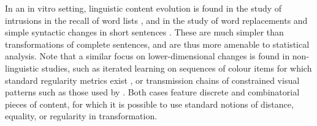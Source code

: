 \documentclass[a4paper,fleqn]{cas-dc}
\begin{document}
In an in vitro setting, linguistic content evolution is found in the study of intrusions in the recall of word lists \citep[see][for a review]{zaromb_temporal_2006}, and in the study of word replacements and simple syntactic changes in short sentences \citep{potter_regeneration_1990,lombardi_regeneration_1992}.
These are much simpler than transformations of complete sentences, and are thus more amenable to statistical analysis. Note that a similar focus on lower-dimensional changes is found in non-linguistic studies, such as iterated learning on sequences of colour items for which standard regularity metrics exist \citep{cornish_systems_2013}, or transmission chains of constrained visual patterns such as those used by \citet{claidiere_cultural_2014}. Both cases feature discrete and combinatorial pieces of content, for which it is possible to use standard notions of distance, equality, or regularity in transformation.



\end{document}
